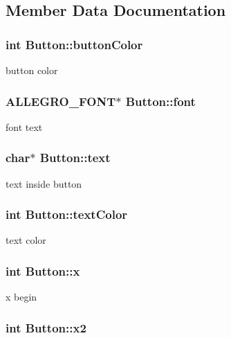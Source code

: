 \subsection{Member Data Documentation}
\hypertarget{struct_button_ac05b2e6dac95881cdf4dbdcf934c2509}{
\subsubsection[{button\-Color}]{\setlength{\rightskip}{0pt plus 5cm}int Button\-::button\-Color}}\label{struct_button_ac05b2e6dac95881cdf4dbdcf934c2509}
button color \hypertarget{struct_button_a3417f40b044358b8a2a0009f481e15c5}{
\subsubsection[{font}]{\setlength{\rightskip}{0pt plus 5cm}A\-L\-L\-E\-G\-R\-O\-\_\-\-F\-O\-N\-T$\ast$ Button\-::font}}\label{struct_button_a3417f40b044358b8a2a0009f481e15c5}
font text \hypertarget{struct_button_adafb1aaa363ab04fca61c94c0937bd3d}{
\subsubsection[{text}]{\setlength{\rightskip}{0pt plus 5cm}char$\ast$ Button\-::text}}\label{struct_button_adafb1aaa363ab04fca61c94c0937bd3d}
text inside button \hypertarget{struct_button_a6d140cd7f6e64c60c1b207d85b9392e6}{
\subsubsection[{text\-Color}]{\setlength{\rightskip}{0pt plus 5cm}int Button\-::text\-Color}}\label{struct_button_a6d140cd7f6e64c60c1b207d85b9392e6}
text color \hypertarget{struct_button_a2ec3bc40025b64b44319e7464164d61f}{
\subsubsection[{x}]{\setlength{\rightskip}{0pt plus 5cm}int Button\-::x}}\label{struct_button_a2ec3bc40025b64b44319e7464164d61f}
x begin \hypertarget{struct_button_af1cfe70765d31617c45a1cd42b1763c0}{
\subsubsection[{x2}]{\setlength{\rightskip}{0pt plus 5cm}int Button\-::x2}}\label{struct_button_af1cfe70765d31617c45a1cd42b1763c0}
